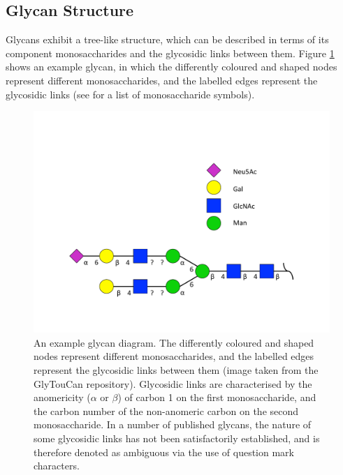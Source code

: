 \documentclass[12pt,a4paper]{article}
\begin{document}
\subsection{Glycan Structure}
\label{sec:glycans_description}
Glycans exhibit a tree-like structure, which can be described in terms of its component monosaccharides and the glycosidic links between them. Figure \ref{fig:example_glycan} shows an example glycan, in which the differently coloured and shaped nodes represent different monosaccharides, and the labelled edges represent the glycosidic links (see  for a list of monosaccharide symbols).

\begin{figure}[H]
\centering 
\includegraphics[scale=0.6]{images/glycan_G31576LD.pdf} 
\caption{An example glycan diagram. The differently coloured and shaped nodes represent different monosaccharides, and the labelled edges represent the glycosidic links between them (image taken from the GlyTouCan repository\protect\footnotemark). Glycosidic links are characterised by the anomericity ($\alpha$ or $\beta$) of carbon 1 on the first monosaccharide, and the carbon number of the non-anomeric carbon on the second monosaccharide. In a number of published glycans, the nature of some glycosidic links has not been satisfactorily established, and is therefore denoted as ambiguous via the use of question mark characters.}
\label{fig:example_glycan}
\end{figure}

\end{document}
